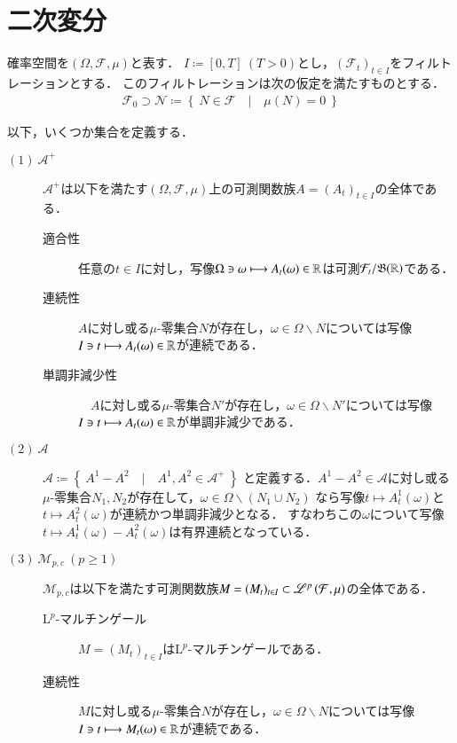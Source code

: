\section{二次変分}
	確率空間を$(\Omega,\mathcal{F},\mu)$と表す．
	$I \coloneqq [0,T]\ (T>0)$とし，$(\mathcal{F}_t)_{t \in I}$をフィルトレーションとする．
	このフィルトレーションは次の仮定を満たすものとする．
	\begin{align}
		\mathcal{F}_0 \supset \mathcal{N} \coloneqq \left\{\ N \in \mathcal{F}\quad |\quad \mu(N) = 0 \ \right\}
	\end{align}
	
	以下，いくつか集合を定義する．
	\begin{description}
		\item[$\mathrm{(1)}\ \mathcal{A}^+$] 
			$\mathcal{A}^+$は以下を満たす$(\Omega,\mathcal{F},\mu)$上の可測関数族$A = (A_t)_{t \in I}$の全体である．
			\begin{description}
				\item[適合性] 任意の$t \in I$に対し，写像$\Omega \ni \omega \longmapsto A_t(\omega) \in \mathbb{R}$は可測$\mathcal{F}_t/\mathfrak{B}(\mathbb{R})$である．
				\item[連続性] $A$に対し或る$\mu$-零集合$N$が存在し，$\omega \in \Omega \backslash N$については写像$I \ni t \longmapsto A_t(\omega) \in \mathbb{R}$が連続である．
				\item[単調非減少性]　$A$に対し或る$\mu$-零集合$N'$が存在し，$\omega \in \Omega \backslash N'$については写像$I \ni t \longmapsto A_t(\omega) \in \mathbb{R}$が単調非減少である．
			\end{description}
		
		\item[$\mathrm{(2)}\ \mathcal{A}$]
			$\mathcal{A} \coloneqq \left\{\ A^1 - A^2\quad |\quad A^1,A^2 \in \mathcal{A}^+\ \right\}$
			と定義する．$A^1 - A^2 \in \mathcal{A}$に対し或る$\mu$-零集合$N_1,N_2$が存在して，$\omega \in \Omega \backslash (N_1 \cup N_2)$
			なら写像$t \longmapsto A^1_t(\omega)$と$t \longmapsto A^2_t(\omega)$が連続かつ単調非減少となる．
			すなわちこの$\omega$について写像$t \longmapsto A^1_t(\omega) - A^2_t(\omega)$は有界連続となっている．
			
		\item[$\mathrm{(3)}\ \mathcal{M}_{p,c}\ (p \geq 1)$]
			$\mathcal{M}_{p,c}$は以下を満たす可測関数族$M = (M_t)_{t \in I} \subset \mathscr{L}^{p} \left(\mathcal{F},\mu\right)$の全体である．
			\begin{description}
				\item[$\mathrm{L}^p$-マルチンゲール] $M = (M_t)_{t \in I}$は$\mathrm{L}^p$-マルチンゲールである．
				\item[連続性] $M$に対し或る$\mu$-零集合$N$が存在し，$\omega \in \Omega \backslash N$については写像$I \ni t \longmapsto M_t(\omega) \in \mathbb{R}$が連続である．
			\end{description}
		

\end{description}
